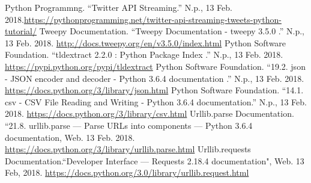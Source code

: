 \documentclass[letterpaper,11pt]{article}
\begin{document}
\clearpage
\begin{thebibliography}{9}
Python Programmng. ``Twitter API Streaming.''  N.p., 13 Feb. 2018.\url{https://pythonprogramming.net/twitter-api-streaming-tweets-python-tutorial/}
Tweepy Documentation. ``Tweepy Documentation - tweepy 3.5.0 .''  N.p., 13 Feb. 2018. \url{http://docs.tweepy.org/en/v3.5.0/index.html}
Python Software Foundation. ``tldextract 2.2.0 : Python Package Index .''  N.p., 13 Feb. 2018. \url{https://pypi.python.org/pypi/tldextract}
Python Software Foundation. ``19.2. json - JSON encoder and decoder - Python 3.6.4 documentation .''  N.p., 13 Feb. 2018. \url{https://docs.python.org/3/library/json.html}
Python Software Foundation. ``14.1. csv - CSV File Reading and Writing - Python 3.6.4 documentation.''  N.p., 13 Feb. 2018. \url{https://docs.python.org/3/library/csv.html}
Urllib.parse Documentation. ``21.8. urllib.parse — Parse URLs into components — Python 3.6.4 documentation, Web. 13 Feb. 2018. \url{https://docs.python.org/3/library/urllib.parse.html}
 Urllib.requests Documentation.``Developer Interface — Requests 2.18.4 documentation", Web. 13 Feb, 2018. \url{https://docs.python.org/3.0/library/urllib.request.html}

\end{thebibliography}
\end{document}
